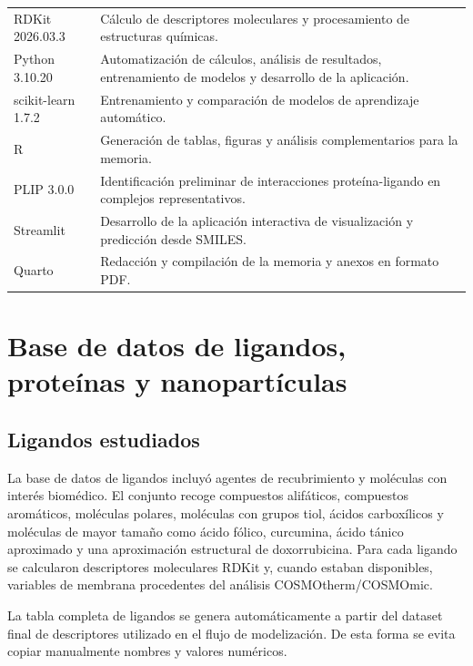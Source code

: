 \documentclass[
  spanish,
  a4paper,
  12pt,
  oneside,
  openany]{memoir}
\newcommand{\apendice}[1]{\chapter{#1}}
\begin{document}
\begin{longtable}{>{\raggedright\arraybackslash}p{}>{\raggedright\arraybackslash}p{}}
RDKit 2026.03.3 & Cálculo de descriptores moleculares y procesamiento de estructuras químicas. \\

Python 3.10.20 & Automatización de cálculos, análisis de resultados, entrenamiento de modelos y desarrollo de la aplicación. \\

scikit-learn 1.7.2 & Entrenamiento y comparación de modelos de aprendizaje automático. \\

R & Generación de tablas, figuras y análisis complementarios para la memoria. \\

PLIP 3.0.0 & Identificación preliminar de interacciones proteína-ligando en complejos representativos. \\

Streamlit & Desarrollo de la aplicación interactiva de visualización y predicción desde SMILES. \\

Quarto & Redacción y compilación de la memoria y anexos en formato PDF. \\

\end{longtable}

\endgroup

\apendice{Base de datos de ligandos, proteínas y nanopartículas}

\section{Ligandos estudiados}

La base de datos de ligandos incluyó agentes de recubrimiento y
moléculas con interés biomédico. El conjunto recoge compuestos
alifáticos, compuestos aromáticos, moléculas polares, moléculas con
grupos tiol, ácidos carboxílicos y moléculas de mayor tamaño como ácido
fólico, curcumina, ácido tánico aproximado y una aproximación
estructural de doxorrubicina. Para cada ligando se calcularon
descriptores moleculares RDKit y, cuando estaban disponibles, variables
de membrana procedentes del análisis COSMOtherm/COSMOmic.

La tabla completa de ligandos se genera automáticamente a partir del
dataset final de descriptores utilizado en el flujo de modelización. De
esta forma se evita copiar manualmente nombres y valores numéricos.

\begingroup
\scriptsize
\setlength{\tabcolsep}{3pt}
\end{document}
